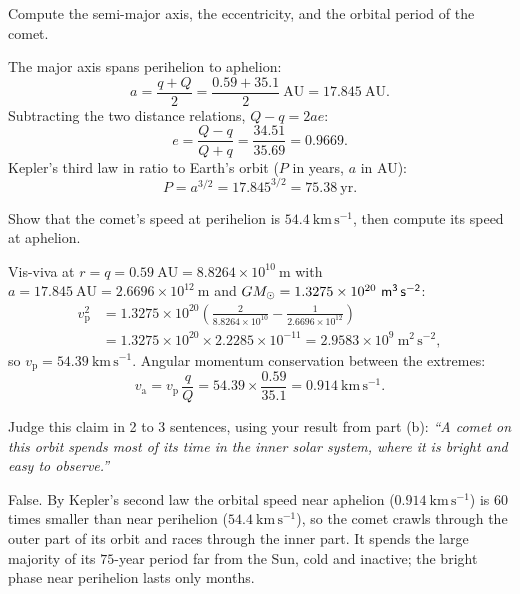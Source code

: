 \parti {} Compute the semi-major axis, the eccentricity, and the orbital period of the comet.

\begin{solution}
The major axis spans perihelion to aphelion:
\[
  a = \frac{q + Q}{2} = \frac{0.59 + 35.1}{2}\ \mathrm{AU} = 17.845\ \mathrm{AU}.
\]
Subtracting the two distance relations, $Q - q = 2ae$:
\[
  e = \frac{Q - q}{Q + q} = \frac{34.51}{35.69} = 0.9669.
\]
Kepler's third law in ratio to Earth's orbit ($P$ in years, $a$ in AU):
\[
  P = a^{3/2} = 17.845^{3/2} = 75.38\ \mathrm{yr}.
\]
\end{solution}

\parti {} Show that the comet's speed at perihelion is $54.4\ \mathrm{km\,s^{-1}}$, then compute its speed at aphelion.

\begin{solution}
Vis-viva at $r = q = 0.59\ \mathrm{AU} = 8.8264 \times 10^{10}\ \mathrm{m}$ with
$a = 17.845\ \mathrm{AU} = 2.6696 \times 10^{12}\ \mathrm{m}$ and
$G\Msun = 1.3275 \times 10^{20}\ \mathrm{m^3\,s^{-2}}$:
\begin{align*}
  v_{\mathrm{p}}^2 &= 1.3275 \times 10^{20} \left( \frac{2}{8.8264 \times 10^{10}} - \frac{1}{2.6696 \times 10^{12}} \right) \\
      &= 1.3275 \times 10^{20} \times 2.2285 \times 10^{-11} = 2.9583 \times 10^{9}\ \mathrm{m^2\,s^{-2}},
\end{align*}
so $v_{\mathrm{p}} = 54.39\ \mathrm{km\,s^{-1}}$.
Angular momentum conservation between the extremes:
\[
  v_{\mathrm{a}} = v_{\mathrm{p}}\, \frac{q}{Q} = 54.39 \times \frac{0.59}{35.1} = 0.914\ \mathrm{km\,s^{-1}}.
\]
\end{solution}

\parti {} Judge this claim in 2 to 3 sentences, using your result from part (b):
\emph{``A comet on this orbit spends most of its time in the inner solar system, where it is bright and easy to observe.''}

\begin{solution}
False.
By Kepler's second law the orbital speed near aphelion ($0.914\ \mathrm{km\,s^{-1}}$) is $60$ times smaller than near perihelion ($54.4\ \mathrm{km\,s^{-1}}$), so the comet crawls through the outer part of its orbit and races through the inner part.
It spends the large majority of its $75$-year period far from the Sun, cold and inactive; the bright phase near perihelion lasts only months.
\end{solution}


